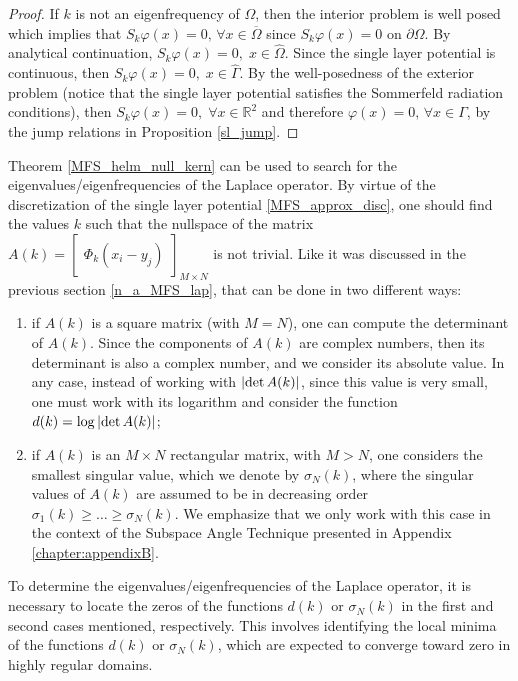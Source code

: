 \begin{proof}
    If \(k\) is not an eigenfrequency of \(\Omega\), then the interior problem is well posed which implies that \(S_k\varphi(x) = 0, \, \forall x \in \overline{\Omega}\) since \(S_k\varphi(x) = 0\) on \(\partial\Omega\). By analytical continuation, \(S_k\varphi(x) = 0, \; x \in \hat{\Omega}\). Since the single layer potential is continuous, then \(S_k\varphi(x) = 0, \; x \in \hat{\Gamma}\). By the well-posedness of the exterior problem (notice that the single layer potential satisfies the Sommerfeld radiation conditions), then \(S_k\varphi(x) = 0, \; \forall x \in \mathbb{R}^2\) and therefore \(\varphi(x) = 0, \, \forall x \in \Gamma\), by the jump relations in Proposition \ref{sl_jump}.
\end{proof}

Theorem \ref{MFS_helm_null_kern} can be used to search for the eigenvalues/eigenfrequencies of the Laplace operator. By virtue of the discretization of the single layer potential \eqref{MFS_approx_disc}, one should find the values \(k\) such that the nullspace of the matrix \(A(k) = \begin{bmatrix}
    \Phi_k(x_i - y_j)
\end{bmatrix}_{M \times N}\) is not trivial. Like it was discussed in the previous section \ref{n_a_MFS_lap}, that can be done in two different ways:
\begin{enumerate}
    \item if \(A(k)\) is a square matrix (with \(M=N\)), one can compute the determinant of \(A(k)\). Since the components of \(A(k)\) are complex numbers, then its determinant is also a complex number, and we consider its absolute value. In any case, instead of working with \(\abs{\determinant A(k)}\), since this value is very small, one must work with its logarithm and consider the function \(d(k) = \log \abs{\determinant A(k)}\);
    \item if \(A(k)\) is an \(M\times N\) rectangular matrix, with \(M > N\), one considers the smallest singular value, which we denote by \(\sigma_N(k)\), where the singular values of \(A(k)\) are assumed to be in decreasing order \(\sigma_1(k) \geq \dots \geq \sigma_N(k)\). We emphasize that we only work with this case in the context of the Subspace Angle Technique presented in Appendix \ref{chapter:appendixB}.
\end{enumerate}

To determine the eigenvalues/eigenfrequencies of the Laplace operator, it is necessary to locate the zeros of the functions \(d(k)\) or \(\sigma_N(k)\) in the first and second cases mentioned, respectively. This involves identifying the local minima of the functions \(d(k)\) or \(\sigma_N(k)\), which are expected to converge toward zero in highly regular domains.

